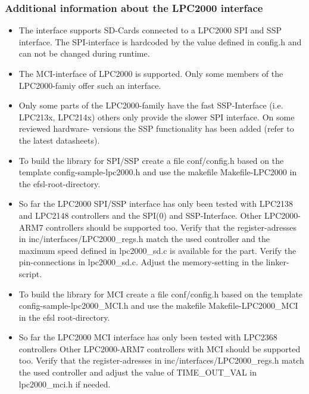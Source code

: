 \subsubsection{Additional information about the LPC2000 interface}
	\begin{itemize}

\item The interface supports SD-Cards
connected to a LPC2000 SPI and SSP interface. 
The SPI-interface is hardcoded by the value 
defined in config.h and can not be 
changed during runtime.

\item The MCI-interface of LPC2000 is supported.
Only some members of the LPC2000-famiy offer such an
interface.

\item Only some parts of the LPC2000-family
have the fast SSP-Interface (i.e. LPC213x,
LPC214x) others only provide the slower 
SPI interface. On some reviewed hardware-
versions the SSP functionality has been added
(refer to the latest datasheets).

\item To build the library for SPI/SSP create 
a file conf/config.h based on the template 
config-sample-lpc2000.h and use the 
makefile Makefile-LPC2000 in the
efsl-root-directory.

\item So far the LPC2000 SPI/SSP interface has only been
tested with LPC2138 and LPC2148 controllers
and the SPI(0) and SSP-Interface.
Other LPC2000-ARM7 controllers 
should be supported too. Verify
that the register-adresses in 
inc/interfaces/LPC2000\_regs.h
match the used controller and the
maximum speed defined in lpc2000\_sd.c
is available for the part.
Verify the pin-connections in lpc2000\_sd.c.
Adjust the memory-setting in the linker-script.

\item To build the library for MCI create 
a file conf/config.h based on the template 
config-sample-lpc2000\_MCI.h and use the 
makefile Makefile-LPC2000\_MCI in the
efsl root-directory.

\item So far the LPC2000 MCI interface has only been
tested with LPC2368 controllers
Other LPC2000-ARM7 controllers with MCI
should be supported too. Verify
that the register-adresses in 
inc/interfaces/LPC2000\_regs.h
match the used controller and 
adjust the value of TIME_OUT_VAL 
in lpc2000\_mci.h if needed.

	\end{itemize}


